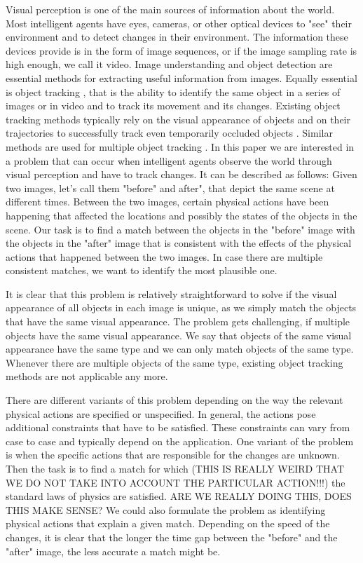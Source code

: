 \documentclass[letterpaper]{article}
\begin{document}
Visual perception is one of the main sources of information about the world. Most intelligent agents have eyes, cameras, or other optical devices to "see" their environment and to detect changes in their environment. The information these devices provide is in the form of image sequences, or if the image sampling rate is high enough, we call it video.
Image understanding \cite{sridhar_video_2011} and object detection \cite{papageorgiou1998general} are essential methods for extracting useful information from images. Equally essential is object tracking \cite{yilmaz2006object}, that is the ability to identify the same object in a series of images or in video and to track its movement and its changes. Existing object tracking methods typically rely on the visual appearance of objects and on their trajectories to successfully track even temporarily occluded objects \cite{}.
Similar methods are used for multiple object tracking \cite{}.
In this paper we are interested in a problem that can occur when intelligent agents observe the world through visual perception and have to track changes.
It can be described as follows: Given two images, let's call them "before" and after", that depict the same scene at different times. Between the two images, certain physical actions have been happening that affected the locations and possibly the states of the objects in the scene. Our task is to find a match between the objects in the "before" image with the objects in the "after" image that is consistent with the effects of the physical actions that happened between the two images. In case there are multiple consistent matches, we want to identify the most plausible one.

It is clear that this problem is relatively straightforward to solve if the visual appearance of all objects in each image is unique, as we simply match the objects that have the same visual appearance. The problem gets challenging, if multiple objects have the same visual appearance. We say that objects of the same visual appearance have the same type and we can only match objects of the same type. Whenever there are multiple objects of the same type, existing object tracking methods are not applicable any more.

There are different variants of this problem depending on the way the relevant physical actions are specified or unspecified. In general, the actions pose additional constraints that have to be satisfied. These constraints can vary from case to case and typically depend on the application. One variant of the problem is when the specific actions that are responsible for the changes are unknown. Then the task is to find a match for which (THIS IS REALLY WEIRD THAT WE DO NOT TAKE INTO ACCOUNT THE PARTICULAR ACTION!!!) the standard laws of physics are satisfied. ARE WE REALLY DOING THIS, DOES THIS MAKE SENSE?
We could also formulate the problem as identifying physical actions that explain a given match.
Depending on the speed of the changes, it is clear that the longer the time gap between the "before" and the "after" image, the less accurate a match might be.
\end{document}
